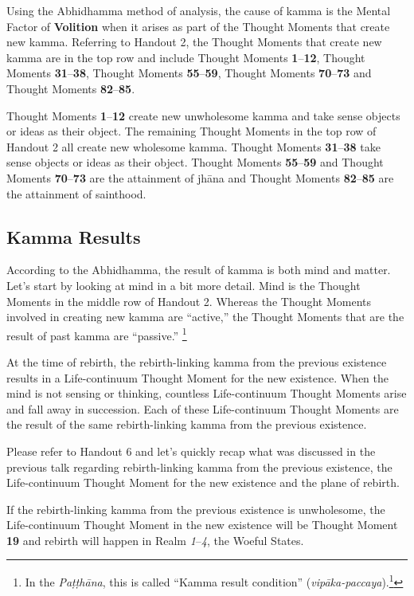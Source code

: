 Using the Abhidhamma method of analysis, the cause of kamma is the Mental Factor of \textbf{Volition} when it arises as part of the Thought Moments that create new kamma. Referring to Handout 2, the Thought Moments that create new kamma are in the top row and include Thought Moments \textbf{1}--\textbf{12}, Thought Moments \textbf{31}--\textbf{38}, Thought Moments \textbf{55}--\textbf{59}, Thought Moments \textbf{70}--\textbf{73} and Thought Moments \textbf{82}--\textbf{85}.

Thought Moments \textbf{1}--\textbf{12} create new unwholesome kamma and take sense objects or ideas as their object. The remaining Thought Moments in the top row of Handout 2 all create new wholesome kamma. Thought Moments \textbf{31}--\textbf{38} take sense objects or ideas as their object. Thought Moments \textbf{55}--\textbf{59} and Thought Moments \textbf{70}--\textbf{73} are the attainment of jhāna and Thought Moments \textbf{82}--\textbf{85} are the attainment of sainthood.

\subsection*{Kamma Results}

According to the Abhidhamma, the result of kamma is both mind and matter. Let’s start by looking at mind in a bit more detail. Mind is the Thought Moments in the middle row of Handout 2. Whereas the Thought Moments involved in creating new kamma are “active,” the Thought Moments that are the result of past kamma are “passive.” \footnote{In the \textit{Paṭṭhāna}, this is called “Kamma result condition” (\textit{vipāka-paccaya}).\footnote{More details in Chapter 12 of “The Conditionality of Life” (see Footnote 2).}}

At the time of rebirth, the rebirth-linking kamma from the previous existence results in a Life-continuum Thought Moment for the new existence. When the mind is not sensing or thinking, countless Life-continuum Thought Moments arise and fall away in succession. Each of these Life-continuum Thought Moments are the result of the same rebirth-linking kamma from the previous existence.

Please refer to Handout 6 and let’s quickly recap what was discussed in the previous talk regarding rebirth-linking kamma from the previous existence, the Life-continuum Thought Moment for the new existence and the plane of rebirth.

If the rebirth-linking kamma from the previous existence is unwholesome, the Life-continuum Thought Moment in the new existence will be Thought Moment \textbf{19} and rebirth will happen in Realm \textit{1}--\textit{4}, the Woeful States. 

